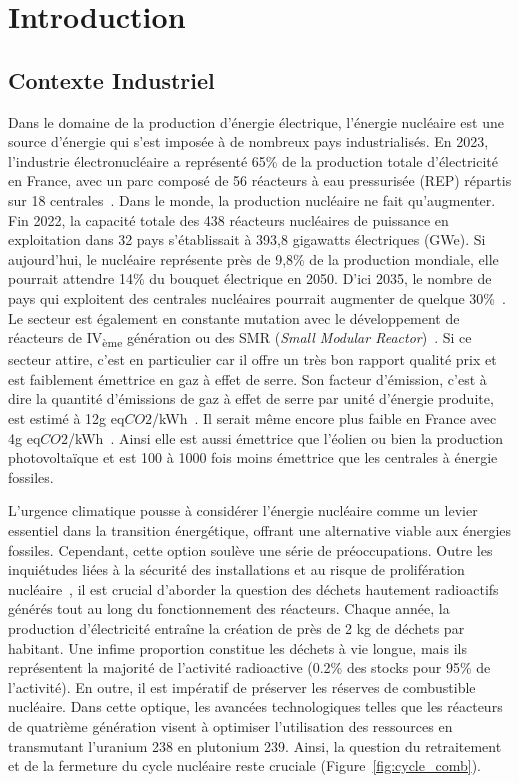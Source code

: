 
\chapter{Introduction}

\section{Contexte Industriel}

Dans le domaine de la production d'énergie électrique, l'énergie nucléaire est une source d'énergie qui s'est imposée à de nombreux pays industrialisés. En 2023, l'industrie électronucléaire a représenté 65\% de la production totale d'électricité en France, avec un parc composé de 56 réacteurs à eau pressurisée (REP) répartis sur 18 centrales~\cite{rte2023}. Dans le monde, la production nucléaire ne fait qu'augmenter. Fin 2022, la capacité totale des 438 réacteurs nucléaires de puissance en exploitation dans 32 pays s’établissait à 393,8 gigawatts électriques (GWe). Si aujourd'hui, le nucléaire représente près de 9,8\% de la production mondiale, elle pourrait attendre 14\% du bouquet électrique en 2050. D'ici 2035, le nombre de pays qui exploitent des centrales nucléaires pourrait augmenter de quelque 30\%~\cite{aiea2023}. Le secteur est également en constante mutation avec le développement de réacteurs de IV\textsubscript{ème} génération ou des SMR (\textit{Small Modular Reactor})~\cite{academie2022}. Si ce secteur attire, c'est en particulier car il offre un très bon rapport qualité prix et est faiblement émettrice en gaz à effet de serre. Son facteur d'émission, c'est à dire la quantité d'émissions de gaz à effet de serre par unité d'énergie produite, est estimé à 12g eq$CO2$/kWh~\cite{schlomer_technology-specific_nodate}. Il serait même encore plus faible en France avec 4g eq$CO2$/kWh~\cite{edf2022}. Ainsi elle est aussi émettrice que l'éolien ou bien la production photovoltaïque et est 100 à 1000 fois moins émettrice que les centrales à énergie fossiles.

L'urgence climatique pousse à considérer l'énergie nucléaire comme un levier essentiel dans la transition énergétique, offrant une alternative viable aux énergies fossiles. Cependant, cette option soulève une série de préoccupations. Outre les inquiétudes liées à la sécurité des installations et au risque de prolifération nucléaire~\cite{npt_resolution}, il est crucial d'aborder la question des déchets hautement radioactifs générés tout au long du fonctionnement des réacteurs. Chaque année, la production d'électricité entraîne la création de près de 2 kg de déchets par habitant. Une infime proportion constitue les déchets à vie longue, mais ils représentent la majorité de l'activité radioactive (0.2\% des stocks pour 95\% de l'activité). En outre, il est impératif de préserver les réserves de combustible nucléaire. Dans cette optique, les avancées technologiques telles que les réacteurs de quatrième génération visent à optimiser l'utilisation des ressources en transmutant l'uranium 238 en plutonium 239. Ainsi, la question du retraitement et de la fermeture du cycle nucléaire reste cruciale (Figure~\ref{fig:cycle_comb}).

